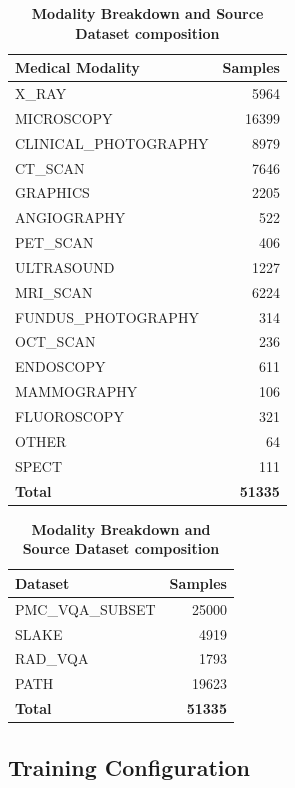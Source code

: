 \documentclass{article}
\theoremstyle{plain}
\theoremstyle{definition}
\theoremstyle{remark}
\begin{document}
\begin{table}[h!]
\centering
\begin{minipage}{0.5\linewidth}
\centering
\caption{\textbf{Modality Breakdown and Source Dataset composition}}
\begin{tabular}{@{}lr@{}}
\toprule
\textbf{Medical Modality} & \textbf{Samples} \\
\midrule
X\_RAY                & 5964 \\
MICROSCOPY            & 16399 \\
CLINICAL\_PHOTOGRAPHY & 8979 \\
CT\_SCAN              & 7646 \\
GRAPHICS              & 2205 \\
ANGIOGRAPHY           & 522 \\
PET\_SCAN             & 406 \\
ULTRASOUND            & 1227 \\
MRI\_SCAN             & 6224 \\
FUNDUS\_PHOTOGRAPHY   & 314 \\
OCT\_SCAN             & 236 \\
ENDOSCOPY             & 611 \\
MAMMOGRAPHY           & 106 \\
FLUOROSCOPY           & 321 \\
OTHER                 & 64 \\
SPECT                 & 111 \\
\midrule
\textbf{Total}        & \textbf{51335} \\
\bottomrule
\end{tabular}
\end{minipage}\hfill
\begin{minipage}{0.5\linewidth}
\centering
\begin{tabular}{@{}lr@{}}
\toprule
\textbf{Dataset} & \textbf{Samples} \\
\midrule
PMC\_VQA\_SUBSET & 25000 \\
SLAKE            & 4919 \\
RAD\_VQA         & 1793 \\
PATH             & 19623 \\
\midrule
\textbf{Total}   & \textbf{51335} \\
\bottomrule
\end{tabular}
\end{minipage}
\end{table}


\subsection{Training Configuration}
\label{app:training-config}
\end{document}
